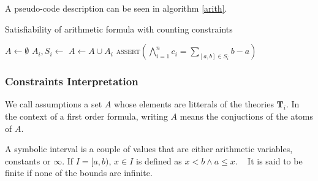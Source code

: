 \documentclass[]{article}
\begin{document}
A pseudo-code description can be seen in algorithm \ref{arith}.

\begin{algorithm}[h]
\caption{Satisfiability of arithmetic formula with counting constraints}\label{arith}
\begin{algorithmic}[1]
\State {}
    \State {}
    \State $A \gets \emptyset$
        \State $A_i, S_i \gets $ 
        \State $A \gets A \cup A_i$
            \State {}
            \State {}
        \EndIf
    \EndFor
    \State {}
    \State \textsc{assert}$\left(\bigwedge\limits_{i=1}^n c_i = \sum\limits_{[a, b] \in S_i} b - a\right)$
        \State {}
        \State {}
    \EndIf
    \State {}
    \State {}
\EndWhile
\State {}
\end{algorithmic}
\label{arith}
\end{algorithm}

\begin{example}
\end{example}
\subsubsection{Constraints
Interpretation}\label{constraints-interpretation}

\begin{definition}[Assumptions]

We call assumptions a set $A$ whose elements are litterals of the theories
$\mathbf{T}_i$. In the context of a first order formula, writing $A$
means the conjuctions of the atoms of $A$.

\label{assumptions}

\end{definition}

\vspace{3mm}

\begin{definition}

A symbolic interval is a couple of values that are either arithmetic
variables, constants or $\infty$. If $I = [a, b)$, $x \in I$ is
defined as $x < b \land a \le x$. \newline~\newline
It is said to be finite if none of the bounds are infinite.

\label{symbolic}

\end{definition}
\end{document}
